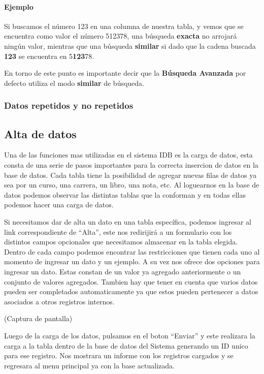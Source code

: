 \documentclass[a4paper,10pt]{article}
\begin{document}
\paragraph{Ejemplo} Si buscamos el número 123 en una columna de nuestra tabla, y vemos que se encuentra como valor el número 512378, una búsqueda \textbf{exacta} no arrojará ningún valor, mientras que una búsqueda \textbf{similar} si dado que la cadena buscada \textbf{123} se encuentra en 5\textbf{123}78.

En torno de este punto es importante decir que la \textbf{Búsqueda Avanzada} por defecto utiliza el modo \textbf{similar} de búsqueda.

\subsubsection{Datos repetidos y no repetidos}

\subsection{Alta de datos}

Una de las funciones mas utilizadas en el sistema IDB es la carga de datos, esta consta de una serie de pasos importantes para la correcta insercion de datos en la base de datos. Cada tabla tiene la posibilidad de agregar nuevas filas de datos ya sea por un curso, una carrera, un libro, una nota, etc. Al loguearnos en la base de datos podemos observar las distintas tablas que la conforman y en todas ellas podemos hacer una carga de datos. 

Si necesitamos dar de alta un dato en una tabla específica, podemos ingresar al link correspondiente de “Alta”, este nos redirijirá a un formulario con los distintos campos opcionales que necesitamos almacenar en la tabla elegida. 
Dentro de cada campo podemos encontrar las restricciones que tienen cada uno al momento de ingresar un dato y un ejemplo. A su vez nos ofrece dos opciones para ingresar un dato. Estas constan de un valor ya agregado anteriormente o un conjunto de valores agregados. Tambien hay que tener en cuenta que varios datos pueden ser completados automaticamente ya que estos pueden pertenecer a datos asociados a otros registros internos. 

(Captura de pantalla)

Luego de la carga de los datos, pulsamos en el boton “Enviar” y este realizara la carga a la tabla dentro de la base de datos del Sistema generando un ID unico para ese registro. Nos mostrara un informe con los registros cargados y se regresara al menu principal ya con la base actualizada.
\end{document}
